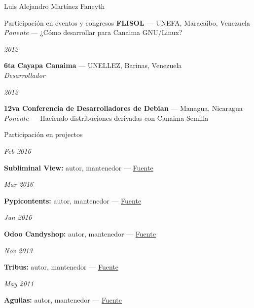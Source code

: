 \documentclass[11pt,letterpaper]{article}
\begin{document}
\begin{cv}{Luis Alejandro Mart\'inez Faneyth}
\begin{cvlist}{Participaci\'on en eventos y congresos}
{{		\textbf{FLISOL} --- UNEFA, Maracaibo, Venezuela\\
		\textit{Ponente} --- ¿C\'omo desarrollar para Canaima GNU/Linux?
	}
}
\item[{\parbox[t]{6em}{\textit{\large{2012}}}}]{
	\parbox[t]{\linewidth}{
		\textbf{6ta Cayapa Canaima} --- UNELLEZ, Barinas, Venezuela\\
		\textit{Desarrollador}
	}
}
\item[{\parbox[t]{6em}{\textit{\large{2012}}}}]{
	\parbox[t]{\linewidth}{
		\textbf{12va Conferencia de Desarrolladores de Debian} --- Managua, Nicaragua\\
		\textit{Ponente} --- Haciendo distribuciones derivadas con Canaima Semilla
	}
}
\end{cvlist}

\begin{cvlist}{Participaci\'on en projectos}
\item[{\parbox[t]{6em}{\textit{\large{Feb 2016}}}}]{
	\parbox[t]{\linewidth}{
		\textbf{Subliminal View:} autor, mantenedor --- \href{http://github.com/LuisAlejandro/subliminal-view}{Fuente}
	}
}
\item[{\parbox[t]{6em}{\textit{\large{Mar 2016}}}}]{
	\parbox[t]{\linewidth}{
		\textbf{Pypicontents:} autor, mantenedor --- \href{http://github.com/LuisAlejandro/pypicontents}{Fuente}
	}
}
\item[{\parbox[t]{6em}{\textit{\large{Jun 2016}}}}]{
	\parbox[t]{\linewidth}{
		\textbf{Odoo Candyshop:} autor, mantenedor --- \href{http://github.com/Vauxoo/odoo-candyshop}{Fuente}
	}
}
\item[{\parbox[t]{6em}{\textit{\large{Nov 2013}}}}]{
	\parbox[t]{\linewidth}{
		\textbf{Tribus:} autor, mantenedor --- \href{http://github.com/LuisAlejandro/tribus}{Fuente}
	}
}
\item[{\parbox[t]{6em}{\textit{\large{May 2011}}}}]{
	\parbox[t]{\linewidth}{
		\textbf{Aguilas:} autor, mantenedor --- \href{http://github.com/LuisAlejandro/aguilas}{Fuente}
	}
}
\end{cvlist}


\end{cv}
\end{document}
